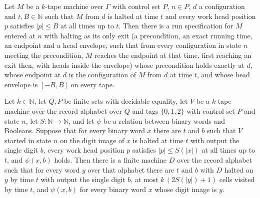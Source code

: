 \begin{lemma}
\label{Complexity.sph_halt_contract}
\leanok
{}
Let $M$ be a $k$-tape machine over $\Gamma$ with control set $P$, $n\in P$, $d$ a configuration
and $t,B\in\mathbb{N}$ such that $M$ from $d$ is halted at time $t$ and every work head position
$p$ satisfies $|p|\le B$ at all times up to $t$. Then there is a run specification for $M$ entered
at $n$ with halting as its only exit (a precondition, an exact running time, an endpoint and a
head envelope, such that from every configuration in state $n$ meeting the precondition, $M$
reaches the endpoint at that time, first reaching an exit then, with heads inside the envelope)
whose precondition holds exactly at $d$, whose endpoint at $d$ is the configuration of $M$ from
$d$ at time $t$, and whose head envelope is $[-B,B]$ on every tape.
\end{lemma}

\begin{lemma}
\label{Complexity.sph_validated_machine}
\leanok
{}
Let $k\in\mathbb{N}$, let $Q,P$ be finite sets with decidable equality, let $V$ be a $k$-tape
machine over the record alphabet over $Q$ and tags $\{0,1,2\}$ with control set $P$ and state $n$,
let $S:\mathbb{N}\to\mathbb{N}$, and let $\psi$ be a relation between binary words and Booleans.
Suppose that for every binary word $x$ there are $t$ and $b$ such that $V$ started in state $n$ on
the digit image of $x$ is halted at time $t$ with output the single digit $b$, every work head
position $p$ satisfies $|p|\le S(|x|)$ at all times up to $t$, and $\psi(x,b)$ holds. Then there is
a finite machine $D$ over the record alphabet such that for every word $y$ over that alphabet
there are $t$ and $b$ with $D$ halted on $y$ by time $t$ with output the single digit $b$, at most
$k\,(2S(|y|)+1)$ cells visited by time $t$, and $\psi(x,b)$ for every binary word $x$ whose digit
image is $y$.
\end{lemma}

